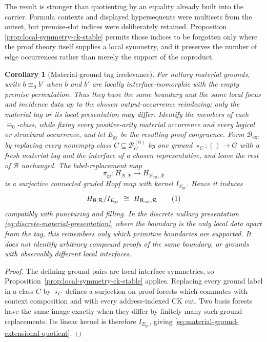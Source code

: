 \documentclass[10pt,a4paper]{article}
\theoremstyle{plain}
\newtheorem{corollary}[theorem]{Corollary}
\theoremstyle{definition}
\theoremstyle{remark}
\newcommand{\Base}{\mathcal B}
\newcommand{\Rules}{\mathcal R}
\newcommand{\eqtag}{\refstepcounter{equation}\tag{\theequation}}
\begin{document}
The result is stronger than quotienting by an equality already built into
the carrier.  Formula contexts and displayed hypersequents were multisets from
the outset, but premise-slot indices were deliberately retained.  Proposition
\ref{prop:local-symmetry-ck-stable} permits those indices to be forgotten only
where the proof theory itself supplies a local symmetry, and it preserves the
number of edge occurrences rather than merely the support of the coproduct.

\begin{corollary}[Material-ground tag irrelevance]
\label{cor:material-ground-proof-irrelevance}
For nullary material grounds, write \(b\equiv_0 b'\) when \(b\) and \(b'\)
are locally interface-isomorphic with the empty premise permutation.  Thus
they have the same boundary and the same local focus and incidence data up to
the chosen output-occurrence reindexing; only the material tag or its local
presentation may differ.  Identify the members of each \(\equiv_0\)-class,
while fixing every positive-arity material occurrence and every logical or
structural occurrence, and let \(E_{\mathrm{gr}}\) be the resulting proof
congruence.  Form \(\Base_{\mathrm{ext}}\) by replacing every nonempty class
\(C\subseteq\Base^{(0)}_G\) by one ground
\(
\star_C:()\to G
\)
with a fresh material tag and the interface of a chosen representative, and
leave the rest of \(\Base\) unchanged.  The label-replacement map
\[
 \pi_{\mathrm{gr}}:
 H_{\Base,\Rules}\longrightarrow H_{\Base_{\mathrm{ext}},\Rules}
\]
is a surjective connected graded Hopf map with kernel
\(I_{E_{\mathrm{gr}}}\).  Hence it induces
\[
 H_{\Base,\Rules}/I_{E_{\mathrm{gr}}}
 \ \cong\
 H_{\Base_{\mathrm{ext}},\Rules}
\eqtag\label{eq:material-ground-extensional-quotient}
\]
compatibly with puncturing and filling.  In the discrete nullary presentation
\eqref{eq:discrete-material-presentation}, where the boundary is the only
local data apart from the tag, this remembers only which primitive boundaries
are supported.  It does not identify arbitrary compound proofs of the same
boundary, or grounds with observably different local interfaces.
\end{corollary}

\begin{proof}
The defining ground pairs are local interface symmetries, so
Proposition~\ref{prop:local-symmetry-ck-stable} applies.  Replacing every
ground label in a class \(C\) by \(\star_C\) defines a surjection on
proof forests which commutes with context composition and with every
address-indexed CK cut.  Two basis forests have the same image exactly when
they differ by finitely many such ground replacements.  Its linear kernel is
therefore \(I_{E_{\mathrm{gr}}}\), giving
\eqref{eq:material-ground-extensional-quotient}.
\end{proof}
\end{document}
